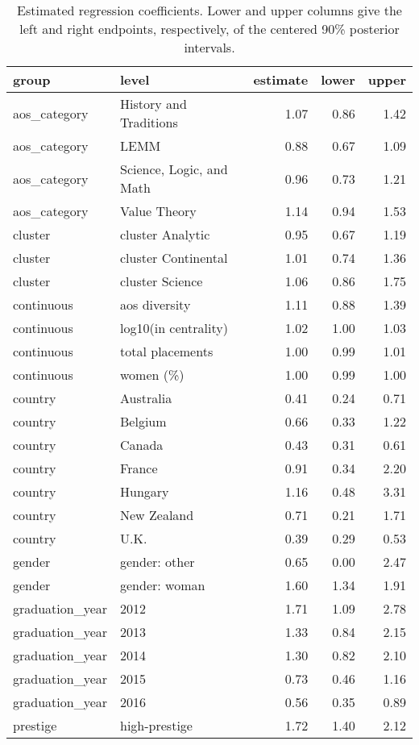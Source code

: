 \begin{table}

\caption{\label{tab:estimates}Estimated regression coefficients.  Lower and upper columns give the left and right endpoints, respectively, of the centered 90\% posterior intervals.}
\centering
\begin{tabular}[t]{llrrr}
\toprule
group & level & estimate & lower & upper\\
\midrule
aos\_category & History and Traditions & 1.07 & 0.86 & 1.42\\
aos\_category & LEMM & 0.88 & 0.67 & 1.09\\
aos\_category & Science, Logic, and Math & 0.96 & 0.73 & 1.21\\
aos\_category & Value Theory & 1.14 & 0.94 & 1.53\\
cluster & cluster Analytic & 0.95 & 0.67 & 1.19\\
\addlinespace
cluster & cluster Continental & 1.01 & 0.74 & 1.36\\
cluster & cluster Science & 1.06 & 0.86 & 1.75\\
continuous & aos diversity & 1.11 & 0.88 & 1.39\\
continuous & log10(in centrality) & 1.02 & 1.00 & 1.03\\
continuous & total placements & 1.00 & 0.99 & 1.01\\
\addlinespace
continuous & women (\%) & 1.00 & 0.99 & 1.00\\
country & Australia & 0.41 & 0.24 & 0.71\\
country & Belgium & 0.66 & 0.33 & 1.22\\
country & Canada & 0.43 & 0.31 & 0.61\\
country & France & 0.91 & 0.34 & 2.20\\
\addlinespace
country & Hungary & 1.16 & 0.48 & 3.31\\
country & New Zealand & 0.71 & 0.21 & 1.71\\
country & U.K. & 0.39 & 0.29 & 0.53\\
gender & gender: other & 0.65 & 0.00 & 2.47\\
gender & gender: woman & 1.60 & 1.34 & 1.91\\
\addlinespace
graduation\_year & 2012 & 1.71 & 1.09 & 2.78\\
graduation\_year & 2013 & 1.33 & 0.84 & 2.15\\
graduation\_year & 2014 & 1.30 & 0.82 & 2.10\\
graduation\_year & 2015 & 0.73 & 0.46 & 1.16\\
graduation\_year & 2016 & 0.56 & 0.35 & 0.89\\
\addlinespace
prestige & high-prestige & 1.72 & 1.40 & 2.12\\
\bottomrule
\end{tabular}
\end{table}